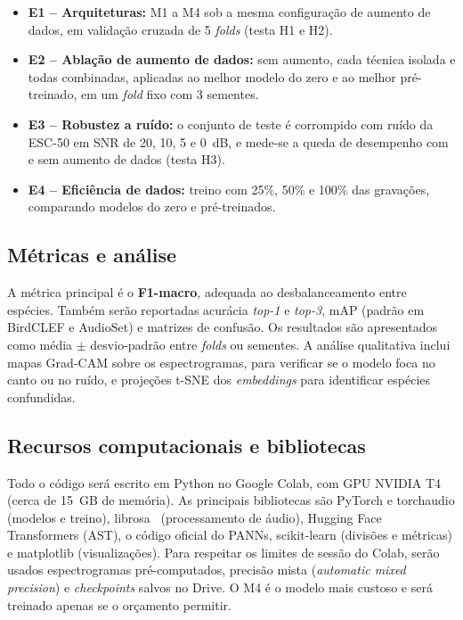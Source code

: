 \documentclass[conference]{IEEEtran}
\begin{document}
\begin{itemize}
  \item \textbf{E1 -- Arquiteturas:} M1 a M4 sob a mesma configuração de aumento de dados, em validação cruzada de 5 \textit{folds} (testa H1 e H2).
  \item \textbf{E2 -- Ablação de aumento de dados:} sem aumento, cada técnica isolada e todas combinadas, aplicadas ao melhor modelo do zero e ao melhor pré-treinado, em um \textit{fold} fixo com 3 sementes.
  \item \textbf{E3 -- Robustez a ruído:} o conjunto de teste é corrompido com ruído da ESC-50 em SNR de 20, 10, 5 e 0~dB, e mede-se a queda de desempenho com e sem aumento de dados (testa H3).
  \item \textbf{E4 -- Eficiência de dados:} treino com 25\%, 50\% e 100\% das gravações, comparando modelos do zero e pré-treinados.
\end{itemize}

\subsection{Métricas e análise}
A métrica principal é o \textbf{F1-macro}, adequada ao desbalanceamento entre espécies. Também serão reportadas acurácia \textit{top-1} e \textit{top-3}, mAP (padrão em BirdCLEF e AudioSet) e matrizes de confusão. Os resultados são apresentados como média $\pm$ desvio-padrão entre \textit{folds} ou sementes. A análise qualitativa inclui mapas Grad-CAM sobre os espectrogramas, para verificar se o modelo foca no canto ou no ruído, e projeções t-SNE dos \textit{embeddings} para identificar espécies confundidas.

\subsection{Recursos computacionais e bibliotecas}
Todo o código será escrito em Python no Google Colab, com GPU NVIDIA T4 (cerca de 15~GB de memória). As principais bibliotecas são PyTorch e torchaudio (modelos e treino), librosa~\cite{mcfee2015librosa} (processamento de áudio), Hugging Face Transformers (AST), o código oficial do PANNs, scikit-learn (divisões e métricas) e matplotlib (visualizações). Para respeitar os limites de sessão do Colab, serão usados espectrogramas pré-computados, precisão mista (\textit{automatic mixed precision}) e \textit{checkpoints} salvos no Drive. O M4 é o modelo mais custoso e será treinado apenas se o orçamento permitir.
\end{document}
